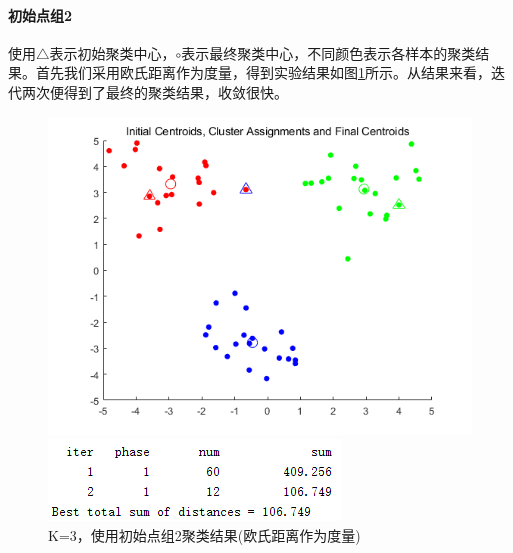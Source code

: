 \documentclass[cn]{elegantbook}
\begin{document}
\paragraph{初始点组2}
使用$\triangle$表示初始聚类中心，$\circ$表示最终聚类中心，不同颜色表示各样本的聚类结果。首先我们采用欧氏距离作为度量，得到实验结果如图\ref{res32}所示。从结果来看，迭代两次便得到了最终的聚类结果，收敛很快。
\begin{figure}[!h]
	\centering
	\begin{minipage}{0.48\linewidth}
		\centering
		\includegraphics[width=\linewidth]{images/res32}
	\end{minipage}
	\begin{minipage}{0.48\linewidth}
		\centering
		\includegraphics[width=\linewidth]{images/res321}
	\end{minipage}
	\caption{\label{res32}K=3，使用初始点组2聚类结果(欧氏距离作为度量)}
\end{figure}
\end{document}
